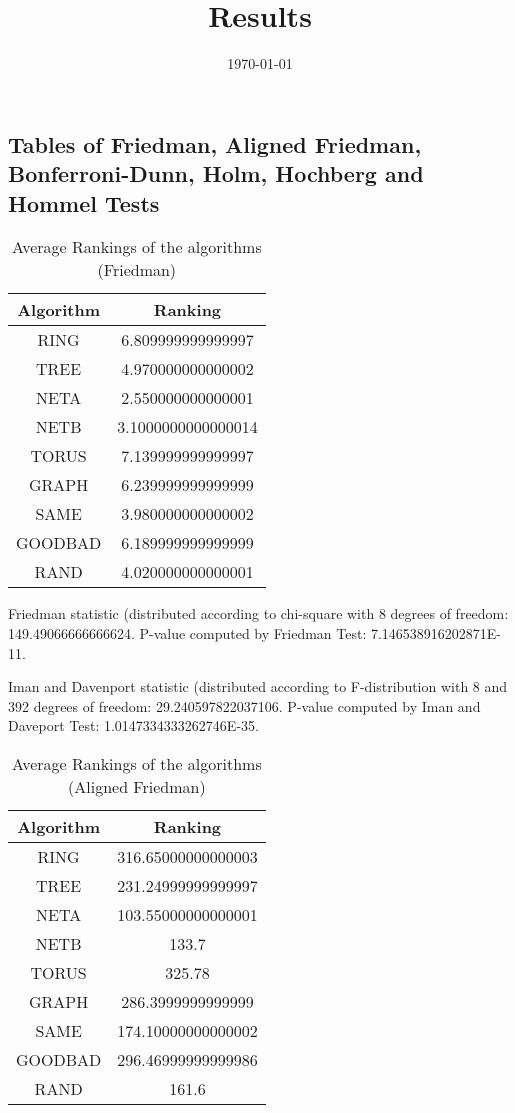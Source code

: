 \documentclass[a4paper,10pt]{article}
\title{Results}
\author{}
\date{\today}
\begin{document}
\begin{landscape}
\oddsidemargin 0in \topmargin 0in\maketitle
\section{Tables of Friedman, Aligned Friedman, Bonferroni-Dunn, Holm, Hochberg and Hommel Tests}
\begin{table}[!htp]
\centering
\caption{Average Rankings of the algorithms (Friedman)
}\begin{tabular}{c|c}
Algorithm&Ranking\\
\hline
 RING&6.809999999999997\\
 TREE&4.970000000000002\\
 NETA&2.550000000000001\\
 NETB&3.1000000000000014\\
 TORUS&7.139999999999997\\
 GRAPH&6.239999999999999\\
 SAME&3.980000000000002\\
 GOODBAD&6.189999999999999\\
 RAND&4.020000000000001\\
\end{tabular}
\end{table}


Friedman statistic (distributed according to chi-square with 8 degrees of freedom: 149.49066666666624. 
P-value computed by Friedman Test: 7.146538916202871E-11.\newline

Iman and Davenport statistic (distributed according to F-distribution with 8 and 392 degrees of freedom: 29.240597822037106. 
P-value computed by Iman and Daveport Test: 1.0147334333262746E-35.\newline


\newpage

\begin{table}[!htp]
\centering
\caption{Average Rankings of the algorithms (Aligned Friedman)
}\begin{tabular}{c|c}
Algorithm&Ranking\\
\hline
 RING&316.65000000000003\\
 TREE&231.24999999999997\\
 NETA&103.55000000000001\\
 NETB&133.7\\
 TORUS&325.78\\
 GRAPH&286.3999999999999\\
 SAME&174.10000000000002\\
 GOODBAD&296.46999999999986\\
 RAND&161.6\\
\end{tabular}
\end{table}



\end{landscape}
\end{document}
